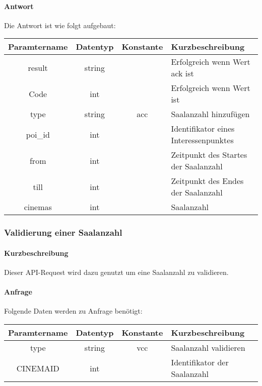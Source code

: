 \paragraph{Antwort}Die Antwort ist wie folgt aufgebaut:
\begin{table}[H]
	\begin{tabular}{|c|c|c|p{6.5cm}|}
		\hline
		\textbf{Paramtername} & \textbf{Datentyp} & \textbf{Konstante} & \textbf{Kurzbeschreibung}                                                                                               \\ \hline
		result              & string           &                 & Erfolgreich wenn Wert {\glqq ack\grqq} ist \\ \hline
		Code                & int              &                 & Erfolgreich wenn Wert {\glqq 0\grqq} ist \\ \hline
		type                & string           & acc             & Saalanzahl hinzufügen \\ \hline
		poi\_id             & int              &                 & Identifikator eines Interessenpunktes \\ \hline
		from                & int              &                 & Zeitpunkt des Startes der Saalanzahl \\ \hline
		till                & int              &                 & Zeitpunkt des Endes der Saalanzahl \\ \hline
		cinemas             & int              &                 & Saalanzahl \\ \hline
	\end{tabular}
\end{table}
\subsubsection{Validierung einer Saalanzahl}
\paragraph{Kurzbeschreibung}Dieser API-Request wird dazu genutzt um eine Saalanzahl zu validieren.
\paragraph{Anfrage}Folgende Daten werden zu Anfrage benötigt:
\begin{table}[H]
	\begin{tabular}{|c|c|c|p{6.5cm}|}
		\hline
		\textbf{Paramtername} & \textbf{Datentyp} & \textbf{Konstante} & \textbf{Kurzbeschreibung}                                                                                               \\ \hline
		type                & string            & vcc                & Saalanzahl validieren \\ \hline
		CINEMAID            & int               &                    & Identifikator der Saalanzahl \\ \hline
	\end{tabular}
\end{table}
